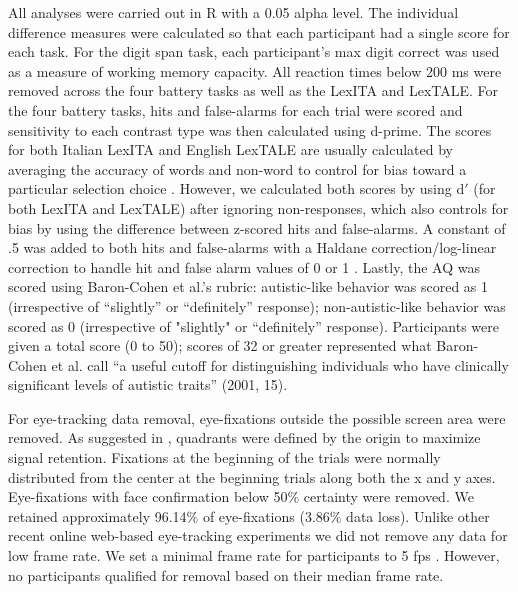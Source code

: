 All analyses were carried out in R \citep[version 4.2.2;][]{R} with a 0.05 alpha level. The individual difference measures were calculated so that each participant had a single score for each task. For the digit span task, each participant's max digit correct was used as a measure of working memory capacity. All reaction times below 200 ms were removed across the four battery tasks as well as the LexITA and LexTALE. For the four battery tasks, hits and false-alarms for each trial were scored and sensitivity to each contrast type was then calculated using d-prime. The scores for both Italian LexITA and English LexTALE are usually calculated by averaging the accuracy of words and non-word to control for bias toward a particular selection choice \citep{lemhofer2012introducing}. However, we calculated both scores by using d$'$ (for both LexITA and LexTALE) after ignoring non-responses, which also controls for bias by using the difference between z-scored hits and false-alarms. A constant of .5 was added to both hits and false-alarms with a Haldane correction/log-linear correction to handle hit and false alarm values of 0 or 1 \citep{Hautus1995}. Lastly, the AQ was scored using Baron-Cohen et al.'s rubric: autistic-like behavior was scored as 1 (irrespective of “slightly” or “definitely” response); non-autistic-like behavior was scored as 0 (irrespective of "slightly" or “definitely” response). Participants were given a total score (0 to 50); scores of 32 or greater represented what Baron-Cohen et al. call “a useful cutoff for distinguishing individuals who have clinically significant levels of autistic traits” (2001, 15). 

For eye-tracking data removal, eye-fixations outside the possible screen area were removed. As suggested in \cite{bramlett_wiener_24-AOW}, quadrants were defined by the origin to maximize signal retention. Fixations at the beginning of the trials were normally distributed from the center at the beginning trials along both the x and y axes. Eye-fixations with face confirmation below 50\% certainty were removed. We retained approximately 96.14\% of eye-fixations (3.86\% data loss). Unlike other recent online web-based eye-tracking experiments we did not remove any data for low frame rate. We set a minimal frame rate for participants to 5 fps \citep{Vos_2017}. However, no participants qualified for removal based on their median frame rate. 


